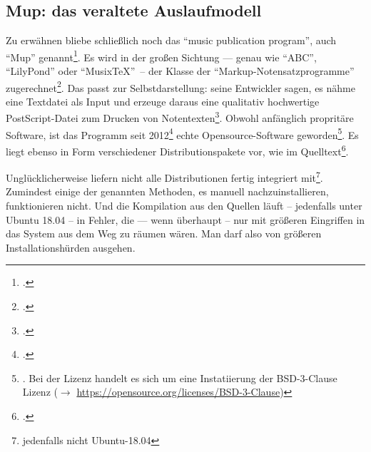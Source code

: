 %
%
%



\subsection{Mup: das veraltete Auslaufmodell}

Zu erwähnen bliebe schließlich noch das \enquote{music publication program},
auch \enquote{Mup} genannt\footcite[vgl.][\nopage wp]{Arkka2017a}. Es wird in
der großen Sichtung --- genau wie \enquote{ABC}, \enquote{LilyPond} oder
\enquote{Musix\TeX}\ -- der Klasse der \enquote{Markup-Notensatzprogramme}
zugerechnet\footcite[vgl.][\nopage wp]{WpedNotensatz2019a}. Das passt zur
Selbstdarstellung: seine Entwickler sagen, es nähme eine Textdatei als Input
und erzeuge daraus eine qualitativ hochwertige PostScript-Datei zum Drucken von
Notentexten\footcite[vgl.][\nopage wp]{Arkka2017a}. Obwohl anfänglich propritäre
Software, ist das Programm seit 2012\footcite[vgl.][\nopage wp]{Arkka2017a}
echte Opensource-Software geworden\footnote{\cite[vgl.][\nopage wp]{Arkka2017b}.
Bei der Lizenz handelt es sich um eine Instatiierung der BSD-3-Clause Lizenz
($\rightarrow$ \href{https://opensource.org/licenses/BSD-3-Clause}
{https://opensource.org/licenses/BSD-3-Clause})}. Es liegt ebenso in Form
verschiedener Distributionspakete vor, wie im Quelltext\footcite[vgl.][\nopage
wp]{Arkka2017c}.

Unglücklicherweise liefern nicht alle Distributionen  fertig integriert
mit\footnote{jedenfalls nicht Ubuntu-18.04}. Zumindest einige der genannten
Methoden, es manuell nachzuinstallieren, funktionieren nicht. Und die
Kompilation aus den Quellen läuft -- jedenfalls unter Ubuntu 18.04 -- in Fehler,
die --- wenn überhaupt -- nur mit größeren Eingriffen in das System aus dem Weg
zu räumen wären. Man darf also von größeren Installationshürden ausgehen.

